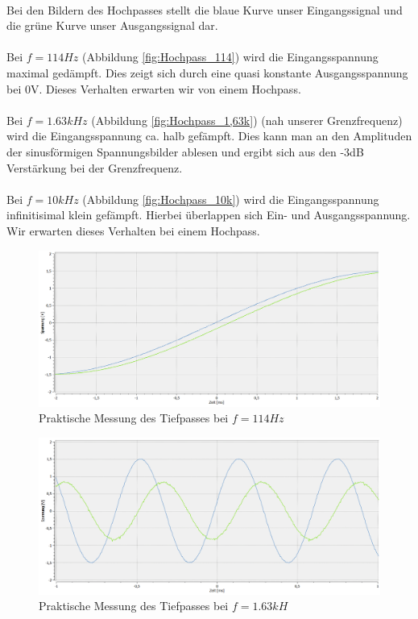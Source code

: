 ~\\
Bei den Bildern des Hochpasses stellt die blaue Kurve unser Eingangssignal und die grüne Kurve unser Ausgangssignal dar.
\\
\\
Bei $f=114Hz$ (Abbildung \ref{fig:Hochpass_114}) wird die Eingangsspannung maximal gedämpft. Dies zeigt sich durch eine quasi konstante Ausgangsspannung bei 0V. Dieses Verhalten erwarten wir von einem Hochpass.
\\
\\
Bei $f=1.63kHz$ (Abbildung \ref{fig:Hochpass_1,63k}) (nah unserer Grenzfrequenz) wird die Eingangsspannung ca. halb gefämpft. Dies kann man an den Amplituden der sinusförmigen Spannungsbilder ablesen und ergibt sich aus den -3dB Verstärkung bei der Grenzfrequenz.
\\
\\
Bei $f=10kHz$ (Abbildung \ref{fig:Hochpass_10k}) wird die Eingangsspannung infinitisimal klein gefämpft. Hierbei überlappen sich Ein- und Ausgangsspannung. Wir erwarten dieses Verhalten bei einem Hochpass.

\newpage
\begin{figure}[htb]
    \includegraphics[width=16cm]{./pictures/Messungen/Tiefpass_114}
    \caption{Praktische Messung des Tiefpasses bei $f=114Hz$}
    \label{fig:Tiefpass_114}
\end{figure}

\begin{figure}[htb]
    \includegraphics[width=16cm]{./pictures/Messungen/Tiefpass_1,63k}
    \caption{Praktische Messung des Tiefpasses bei $f=1.63kH$}
    \label{fig:Tiefpass_1,63k}
\end{figure}

